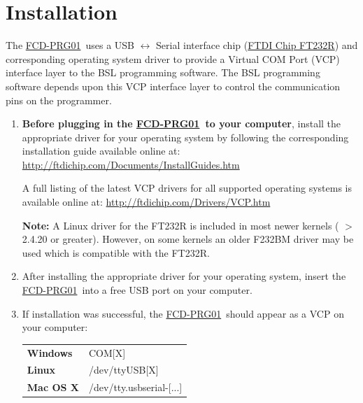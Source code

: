 \documentclass[10pt,letterpaper]{datasheet}
\newcommand{\PIDNOLINK}{FCD\nobreakdash-PRG01}
\newcommand{\PID}{\href{http://www.flyingcampdesign.com/msp430-bsl-programmer.html}{\PIDNOLINK}}
\begin{document}
\section*{Installation}
\begin{flushleft}
  The \PID\ uses a USB $\leftrightarrow$ Serial interface chip (\href{http://ftdichip.com/Products/FT232R.htm}{FTDI Chip FT232R}) and corresponding operating system driver to provide a Virtual COM Port (VCP) interface layer to the BSL programming software.  The BSL programming software depends upon this VCP interface layer to control the communication pins on the programmer.\\
  \begin{enumerate}
    \item \textbf{Before plugging in the \PID\ to your computer}, install the appropriate driver for your operating system by following the corresponding installation guide available online at: \newline
    \href{http://ftdichip.com/Documents/InstallGuides.htm}{http://ftdichip.com/Documents/InstallGuides.htm} \newline

    A full listing of the latest VCP drivers for all supported operating systems is available online at: \newline \href{http://ftdichip.com/Drivers/VCP.htm}{http://ftdichip.com/Drivers/VCP.htm} \newline

    \textbf{Note:} A Linux driver for the FT232R is included in most newer kernels ( $>$ 2.4.20 or greater).  However, on some kernels an older F232BM driver may be used which is compatible with the FT232R.  \newline

    \item After installing the appropriate driver for your operating system, insert the \PID\ into a free USB port on your computer.

    \item If installation was successful, the \PID\ should appear as a VCP on your computer:

    \label{tab:elec-io}
    \begin{tabular}{l l}
      \textbf{Windows} & COM[X] \\
      \textbf{Linux} & /dev/ttyUSB[X] \\
      \textbf{Mac OS X} & /dev/tty.usbserial-[...] \\
    \end{tabular}
  \end{enumerate}
\end{flushleft}
\end{document}
